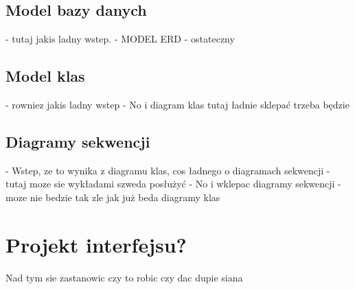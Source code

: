 \subsection{Model bazy danych}
- tutaj jakis ladny wstep.\newline
- MODEL ERD - ostateczny \newline

\subsection{Model klas}
- rowniez jakis ladny wstep \newline
- No i diagram klas tutaj ładnie sklepać trzeba będzie \newline

\subsection{Diagramy sekwencji}
- Wstep, ze to wynika z diagramu klas, cos ładnego o diagramach sekwencji - tutaj moze sie wykładami szweda posłużyć \newline
- No i wklepac diagramy sekwencji - moze nie bedzie tak zle jak już beda diagramy klas \newline
\section {Projekt interfejsu?}
Nad tym sie zastanowic czy to robic czy dac dupie siana

